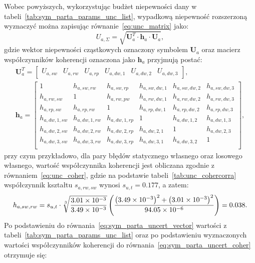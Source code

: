 Wobec powyższych, wykorzystując budżet niepewności dany w tabeli~\ref{tab:sym_parta_params_unc_list}, wypadkową niepewność rozszerzoną wyznaczyć można zapisując równanie~\eqref{eq:unc_matrix} jako:
\begin{equation}
U_{a,\Sigma} = \sqrt{\mathbf{U}_{a}^{T} \cdot \mathbf{h}_{a} \cdot \mathbf{U}_{a}} \label{eq:sym_parta_uncert_sum},
\end{equation}
gdzie wektor niepewności cząstkowych oznaczony symbolem $\mathbf{U}_{a}$ oraz macierz współczynników koherencji oznaczona jako $\mathbf{h}_{a}$ przyjmują postać:
\begin{gather}
\mathbf{U}_{a}^{T} =
\begin{bmatrix}
U_{a,sw} & U_{a,rw} & U_{a,rp} & U_{a,dw,1} & U_{a,dw,2} & U_{a,dw,3}
\end{bmatrix}
\label{eq:sym_parta_uncert_vector}, \\
\mathbf{h}_{a} =
\begin{bmatrix}
1             & h_{a,sw,rw}   & h_{a,sw,rp}   & h_{a,sw,dw,1} & h_{a,sw,dw,2} & h_{a,sw,dw,3} \\
h_{a,rw,sw}   & 1             & h_{a,rw,pw}   & h_{a,rw,dw,1} & h_{a,rw,dw,2} & h_{a,rw,dw,3} \\
h_{a,rp,sw}   & h_{a,rp,rw}   & 1             & h_{a,rp,dw,1} & h_{a,rp,dw,2} & h_{a,rp,dw,3} \\
h_{a,dw,1,sw} & h_{a,dw,1,rw} & h_{a,dw,1,rp} & 1             & h_{a,dw,1,2}  & h_{a,dw,1,3}  \\
h_{a,dw,2,sw} & h_{a,dw,2,rw} & h_{a,dw,2,rp} & h_{a,dw,2,1}  & 1             & h_{a,dw,2,3}  \\
h_{a,dw,3,sw} & h_{a,dw,3,rw} & h_{a,dw,3,rp} & h_{a,dw,3,1}  & h_{a,dw,3,2}  & 1             \\
\end{bmatrix}
\label{eq:sym_parta_uncert_coher},
\end{gather}
przy czym przykładowo, dla pary błędów statycznego własnego oraz losowego własnego, wartość współczynnika koherencji jest obliczana zgodnie z równaniem~\eqref{eq:unc_coher}, gdzie na podstawie tabeli~\ref{tab:unc_cohercorra} współczynnik kształtu $s_{a,rw,sw}$ wynosi $s_{u,t} = 0.177$, a zatem:
\begin{equation}
h_{a,sw,rw} = s_{u,t} \cdot \sqrt[3]{\frac{\num{3.01e-3}}{\num{3.49e-3}}} \left( \frac{\left(\num{3.49e-3}\right)^{2} + \left(\num{3.01e-3}\right)^{2}}{\num{94.05e-6}} \right) = 0.038 \label{eq:sym_parta_coher_sw_rw}.
\end{equation}
Po podstawieniu do równania~\eqref{eq:sym_parta_uncert_vector} wartości z tabeli~\ref{tab:sym_parta_params_unc_list} oraz po podstawieniu wyznaczonych wartości współczynników koherencji do równania~\eqref{eq:sym_parta_uncert_coher} otrzymuje się:
